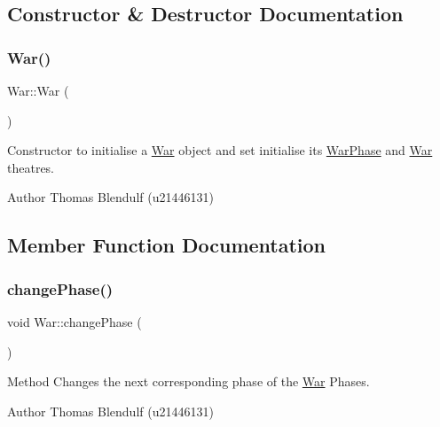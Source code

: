 \subsection{Constructor \& Destructor Documentation}
\mbox{\label{class_war_a8e837395251af1ea071b3624e85c5a67}} 
\subsubsection{\texorpdfstring{War()}{War()}}
{\footnotesize\ttfamily War\+::\+War (\begin{DoxyParamCaption}{ }\end{DoxyParamCaption})}



Constructor to initialise a \mbox{\hyperlink{class_war}{War}} object and set initialise its \mbox{\hyperlink{class_war_phase}{War\+Phase}} and \mbox{\hyperlink{class_war}{War}} theatres. 

\begin{DoxyAuthor}{Author}
Thomas Blendulf (u21446131) 
\end{DoxyAuthor}


\subsection{Member Function Documentation}
\mbox{\label{class_war_a3ecc0e5be41604717bb26d86a2c24571}} 
\subsubsection{\texorpdfstring{changePhase()}{changePhase()}}
{\footnotesize\ttfamily void War\+::change\+Phase (\begin{DoxyParamCaption}{ }\end{DoxyParamCaption})}



Method Changes the next corresponding phase of the \mbox{\hyperlink{class_war}{War}} Phases. 

\begin{DoxyAuthor}{Author}
Thomas Blendulf (u21446131) 
\end{DoxyAuthor}
\mbox{\label{class_war_a676ab0df108bc16b7de2616b2d7b90f8}} 

